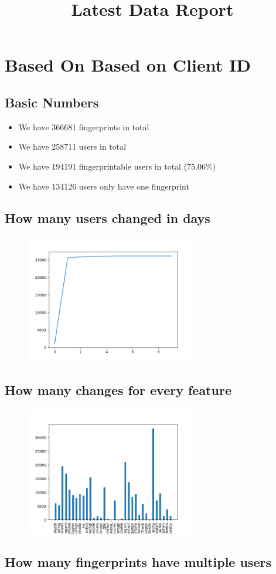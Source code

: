 \documentclass[10pt, conference, compsocconf]{IEEEtran}
\begin{document}
\title{Latest Data Report}
\author{
}
\maketitle
\section{Based On Based on Client ID}
\subsection{Basic Numbers}
\begin{itemize}\item We have 366681 fingerprints in total\item We have 258711 users in total\item We have 194191 fingerprintable users in total (75.06\%)\item We have 134126 users only have one fingerprint \end{itemize}\subsection{How many users changed in days}
\begin{figure}[H]\centering\includegraphics[width=75mm,scale=0.5]{BasedonClientIDchangebytime}\end{figure}\subsection{How many changes for every feature}
\begin{figure}[H]\centering\includegraphics[width=75mm,scale=0.5]{BasedonClientIDfeaturechange}\end{figure}\subsection{How many fingerprints have multiple users}
\end{document}
